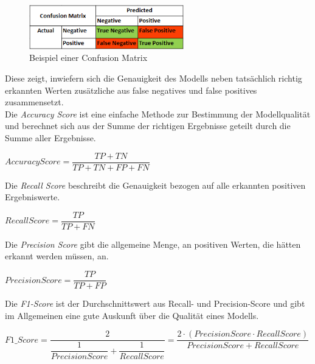 \begin{figure}[h]
    \centering
    \includegraphics[width=0.6\textwidth]{pic/confusion_matrix_ex.png}
    \caption{Beispiel einer Confusion Matrix}
    \label{fig:CV}
\end{figure}

Diese zeigt, inwiefern sich die Genauigkeit des Modells neben tatsächlich richtig erkannten Werten zusätzliche
aus false negatives und false positives zusammensetzt.\\
\newpage
Die \textit{Accuracy Score} ist eine einfache Methode zur Bestimmung der Modellqualität und berechnet sich 
aus der Summe der richtigen Ergebnisse geteilt durch die Summe aller Ergebnisse.

\begin{center}
    $AccuracyScore = \dfrac{TP + TN}{TP + TN + FP + FN}$    
\end{center}
Die \textit{Recall Score} beschreibt die Genauigkeit bezogen auf alle erkannten positiven Ergebniswerte. 
\begin{center}
    $RecallScore = \dfrac{TP}{TP + FN}$    
\end{center}

Die \textit{Precision Score} gibt die allgemeine Menge, an positiven Werten, die hätten erkannt werden müssen,
an.
\begin{center}
    $PrecisionScore = \dfrac{TP}{TP + FP}$    
\end{center}

Die \textit{F1-Score} ist der Durchschnittswert aus Recall- und Precision-Score und gibt im Allgemeinen eine 
gute Auskunft über die Qualität eines Modells.\\

\begin{center}
    $F1\_Score = \dfrac{2}{\dfrac{1}{PrecisionScore} + \dfrac{1}{RecallScore}} = \dfrac{2 \cdot (PrecisionScore \cdot RecallScore)}{PrecisionScore + RecallScore}$    
\end{center}

